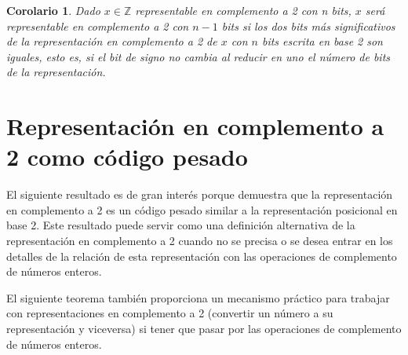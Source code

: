 \documentclass[spanish,a4paper,12pt,titlepage]{article}
\newtheorem{corollary}[theorem]{Corolario}
\theoremstyle{definition}
\theoremstyle{remark}
\newcommand{\bbZ}{\mathbb{Z}}
\begin{document}
\begin{corollary}
    Dado $x \in \bbZ$ representable en complemento a 2 con n bits, $x$ será representable en complemento a 2 con $n-1$ bits si los dos bits más significativos de la representación en complemento a 2 de $x$ con $n$ bits escrita en base 2 son iguales, esto es, si el bit de signo no cambia al reducir en uno el número de bits de la representación.
\end{corollary}

\section{Representación en complemento a 2 como código pesado}

El siguiente resultado es de gran interés porque demuestra que la representación en complemento a 2 es un código pesado similar a la representación posicional en base 2. Este resultado puede servir como una definición alternativa de la representación en complemento a 2 cuando no se precisa o se desea entrar en los detalles de la relación de esta representación con las operaciones de complemento de números enteros.

El siguiente teorema también proporciona un mecanismo práctico para trabajar con representaciones en complemento a 2 (convertir un número a su representación y viceversa) si tener que pasar por las operaciones de complemento de números enteros.
\end{document}

